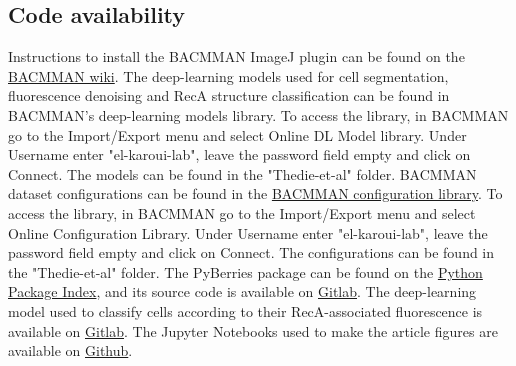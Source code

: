 \subsection*{Code availability}
Instructions to install the BACMMAN ImageJ plugin can be found on the \href{https://github.com/jeanollion/bacmman/wiki/Installation}{BACMMAN wiki}. The deep-learning models used for cell segmentation, fluorescence denoising and RecA structure classification can be found in BACMMAN's deep-learning models library. To access the library, in BACMMAN go to the Import/Export menu and select Online DL Model library. Under Username enter "el-karoui-lab", leave the password field empty and click on Connect. The models can be found in the "Thedie-et-al" folder. BACMMAN dataset configurations can be found in the \href{https://github.com/jeanollion/bacmman/wiki/Online-Configuration-Library}{BACMMAN configuration library}. To access the library, in BACMMAN go to the Import/Export menu and select Online Configuration Library. Under Username enter "el-karoui-lab", leave the password field empty and click on Connect. The configurations can be found in the "Thedie-et-al" folder. The PyBerries package can be found on the \href{https://pypi.org/project/PyBerries/}{Python Package Index}, and its source code is available on \href{https://gitlab.com/MEKlab/pyberries}{Gitlab}. The deep-learning model used to classify cells according to their RecA-associated fluorescence is available on \href{https://gitlab.com/MEKlab/bacmman-object-classifier}{Gitlab}. The Jupyter Notebooks used to make the article figures are available on \href{https://github.com/DanielThedie/RecB_article}{Github}.

